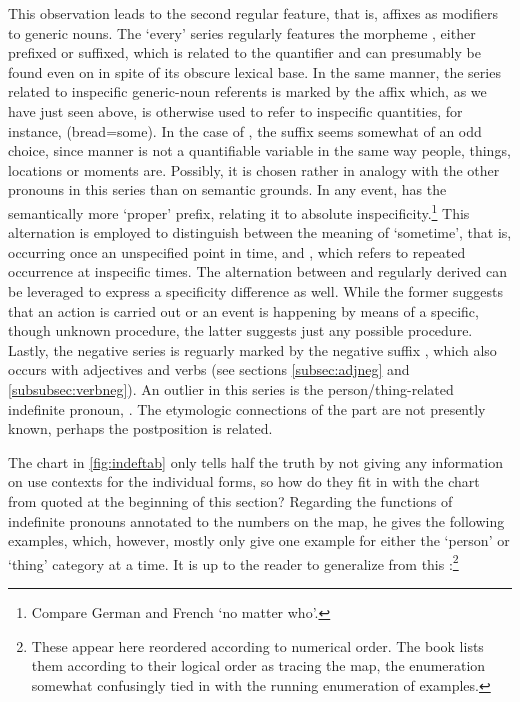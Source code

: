 This observation leads to the second regular feature, that is, affixes as 
modifiers to generic nouns. The `every' series regularly features the 
morpheme , either prefixed or suffixed, which is related to the 
quantifier  and can presumably be found 
even on  in spite of its obscure lexical base. In the same 
manner, the series related to inspecific generic-noun referents is marked by 
the affix  which, as we have just seen above, is otherwise 
used to refer to inspecific quantities, for instance, 
 (bread=some). In the case of 
, the suffix seems somewhat of an 
odd choice, since manner is not a quantifiable variable in the same way 
people, things, locations or moments are. Possibly, it is chosen rather in 
analogy with the other pronouns in this series than on semantic grounds. In any 
event,  has the semantically more `proper'  
prefix, relating it to absolute inspecificity.\footnote{Compare German 
 and French  `no matter who'.} This 
alternation is employed to distinguish between the meaning of `sometime', that 
is, occurring once an unspecified point in time, and 
, which refers to repeated occurrence at
inspecific times. The alternation between  and 
regularly derived  can be leveraged to express a 
specificity difference as well. While the former suggests that an action is 
carried out or an event is happening by means of a specific, though unknown 
procedure, the latter suggests just any possible procedure. Lastly, the negative 
series is reguarly marked by the negative suffix , which also 
occurs with adjectives and verbs (see sections \ref{subsec:adjneg} and 
\ref{subsubsec:verbneg}). An outlier in this series is the person/thing-related 
indefinite pronoun, . The etymologic connections of the 
 part are not presently known, perhaps the postposition 
 is related.

The chart in \autoref{fig:indeftab} only tells half the truth by not giving any 
information on use contexts for the individual forms, so how do they fit 
in with the chart from \citet{haspelmath1997} quoted at the beginning of this 
section? Regarding the functions of indefinite pronouns annotated to the 
numbers on the map, he gives the following examples, which, however, mostly 
only give one example for either the `person' or `thing' category at a time. It 
is up to the reader to generalize from this 
\citep[2--3]{haspelmath1997}:\footnote{These appear here reordered according to 
numerical order. The book lists them according to their logical order as 
tracing the map, the enumeration somewhat confusingly tied in with the running 
enumeration of examples.}

